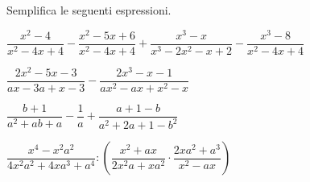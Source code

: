 \begin{esercizio}
Semplifica le seguenti espressioni.
\begin{enumeratea}
\item \(\dfrac{x^{2}-4}{x^{2}-4x+4}-\dfrac{x^{2}-5x+6}{x^{2}-4x+4}+
\dfrac{x^{3}-x}{x^{3}-2x^{2}-x+2}-\dfrac{x^{3}-8}{x^{2}-4x+4}\)
\sol{,~\dots}
\item \(\dfrac{2x^{2}-5x-3}{ax-3a+x-3}-\dfrac{2x^{3}-x-1}{ax^{2}-ax+x^{2}-x}\)
\sol{,~\dots}
\item \(\dfrac{b+1}{a^{2}+ab+a}-\dfrac{1}{a}+\dfrac{a+1-b}{a^{2}+2a+1-b^{2}}\)
\sol{,~\dots}
\item \(\dfrac{x^{4}-x^{2}a^{2}}{4x^{2}a^{2}+4xa^{3}+a^{4}}:
\left(\dfrac{x^{2}+ax}{2x^{2}a+xa^{2}}\cdot
{\dfrac{2xa^{2}+a^{3}}{x^{2}-ax}}\right)\)
\sol{,~\dots}
\end{enumeratea}
\end{esercizio}

